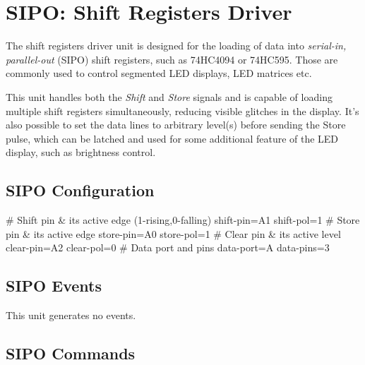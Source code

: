 \section{SIPO: Shift Registers Driver}

The shift registers driver unit is designed for the loading of data into \textit{serial-in, parallel-out} (SIPO) shift registers, such as 74HC4094 or 74HC595. Those are commonly used to control segmented LED displays, LED matrices etc.

This unit handles both the \textit{Shift} and \textit{Store} signals and is capable of loading multiple shift registers simultaneously, reducing visible glitches in the display. It's also possible to set the data lines to arbitrary level(s) before sending the Store pulse, which can be latched and used for some additional feature of the LED display, such as brightness control.


\subsection{SIPO Configuration}

\begin{inicode}
# Shift pin & its active edge (1-rising,0-falling)
shift-pin=A1
shift-pol=1
# Store pin & its active edge
store-pin=A0
store-pol=1
# Clear pin & its active level
clear-pin=A2
clear-pol=0
# Data port and pins
data-port=A
data-pins=3
\end{inicode}

\subsection{SIPO Events}

This unit generates no events.

\subsection{SIPO Commands}

